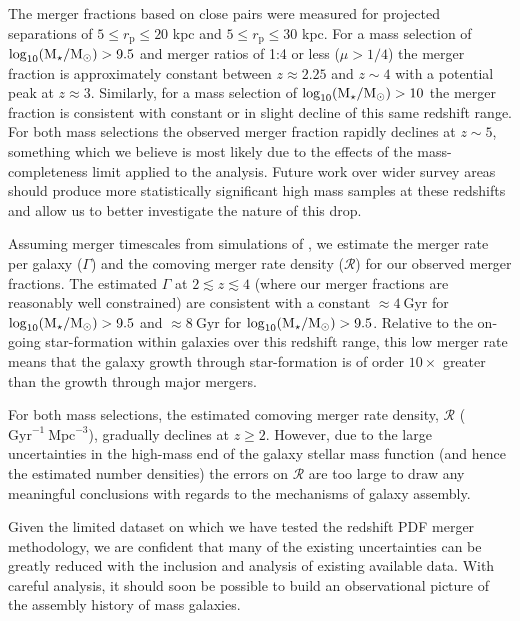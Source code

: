 The merger fractions based on close pairs were measured for projected separations of $5 \leq r_{\text{p}} \leq 20$ kpc and $5 \leq r_{\text{p}} \leq 30$ kpc. For a mass selection of $\log_{10}(\text{M}_{\star} / \text{M}_{\odot}) > 9.5$ and merger ratios of 1:4 or less ($\mu > 1/4$) the merger fraction  is approximately constant between $z \approx 2.25$ and $z\sim4$ with a potential peak at $z\approx3$. Similarly, for a mass selection of $\log_{10}(\text{M}_{\star} / \text{M}_{\odot}) > 10$ the merger fraction is consistent with constant or in slight decline of this same redshift range. For both mass selections the observed merger fraction rapidly declines at $z\sim5$, something which we believe is most likely due to the effects of the mass-completeness limit applied to the analysis. Future work over wider survey areas should produce more statistically significant high mass samples at these redshifts and allow us to better investigate the nature of this drop.

Assuming merger timescales from simulations of \citet{Lotz:2010ie}, we estimate the merger rate per galaxy ($\Gamma$) and the comoving merger rate density ($\mathcal{R}$) for our observed merger fractions. The estimated $\Gamma$ at $2 \lesssim z \lesssim 4$ (where our merger fractions are reasonably well constrained) are consistent with a constant $\approx 4 ~\text{Gyr}$ for $\log_{10}(\text{M}_{\star} / \text{M}_{\odot}) > 9.5$ and $\approx 8 ~\text{Gyr}$ for $\log_{10}(\text{M}_{\star} / \text{M}_{\odot}) > 9.5$. Relative to the on-going star-formation within galaxies over this redshift range, this low merger rate means that the galaxy growth through star-formation is of order $10\times$ greater than the growth through major mergers.

For both mass selections, the estimated comoving merger rate density, $\mathcal{R}$ ($\text{Gyr}^{-1} ~ \text{Mpc}^{-3}$), gradually declines at $z\geq 2$. However, due to the large uncertainties in the high-mass end of the galaxy stellar mass function (and hence the estimated number densities) the errors on $\mathcal{R}$ are too large to draw any meaningful conclusions with regards to the mechanisms of galaxy assembly.

Given the limited dataset on which we have tested the redshift PDF merger methodology, we are confident that many of the existing uncertainties can be greatly reduced with the inclusion and analysis of existing available data. With careful analysis, it should soon be possible to build an observational picture of the assembly history of mass galaxies.



